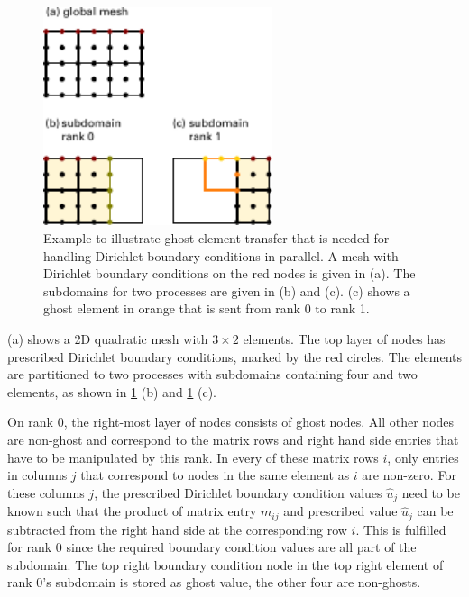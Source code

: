 \begin{figure}%
  \centering%
  \includegraphics[width=0.6\textwidth]{images/implementation/dirichlet_bc_example.pdf}%
  \caption{Example to illustrate ghost element transfer that is needed for handling Dirichlet boundary conditions in parallel. A mesh with Dirichlet boundary conditions on the red nodes is given in (a). The subdomains for two processes are given in (b) and (c). (c) shows a ghost element in orange that is sent from rank 0 to rank 1.}%
  \label{fig:dirichlet_bc_example}%
\end{figure}%

 (a) shows a 2D quadratic mesh with $3 \times 2$ elements. The top layer of nodes has prescribed Dirichlet boundary conditions, marked by the red circles. The elements are partitioned to two processes with subdomains containing four and two elements, as shown in \cref{fig:dirichlet_bc_example} (b) and \cref{fig:dirichlet_bc_example} (c). 

On rank 0, the right-most layer of nodes consists of ghost nodes. All other nodes are non-ghost and correspond to the matrix rows and right hand side entries that have to be manipulated by this rank.
In every of these matrix rows $i$, only entries in columns $j$ that correspond to nodes in the same element as $i$ are non-zero. For these columns $j$, the prescribed Dirichlet boundary condition values $\hat{u}_j$ need to be known such that the product of matrix entry $m_{ij}$ and prescribed value $\hat{u}_j$ can be subtracted from the right hand side at the corresponding row $i$. This is fulfilled for rank 0 since the required boundary condition values are all part of the subdomain. The top right boundary condition node in the top right element of rank 0's subdomain is stored as ghost value, the other four are non-ghosts.

